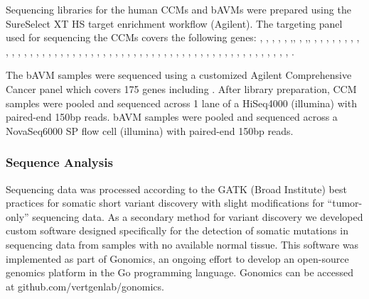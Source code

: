 Sequencing libraries for the human CCMs and bAVMs were prepared using the SureSelect XT HS target enrichment workflow (Agilent). The targeting panel used for sequencing the CCMs covers the following genes: , , , , ,  ,, , ,, , , , , , , , , , , , , , , , , , , , , , , , , , , , , , , , , , , , , , , , , , , , , , , , , , , , , , , , . 

The bAVM samples were sequenced using a customized Agilent Comprehensive Cancer panel which covers 175 genes including . After library preparation, CCM samples were pooled and sequenced across 1 lane of a HiSeq4000 (illumina) with paired-end 150bp reads. bAVM samples were pooled and sequenced across a NovaSeq6000 SP flow cell (illumina) with paired-end 150bp reads. 

\subsubsection{Sequence Analysis}
Sequencing data was processed according to the GATK (Broad Institute) best practices for somatic short variant discovery with slight modifications for “tumor-only” sequencing data. As a secondary method for variant discovery we developed custom software designed specifically for the detection of somatic mutations in sequencing data from samples with no available normal tissue. This software was implemented as part of Gonomics, an ongoing effort to develop an open-source genomics platform in the Go programming language. Gonomics can be accessed at github.com/vertgenlab/gonomics. 

